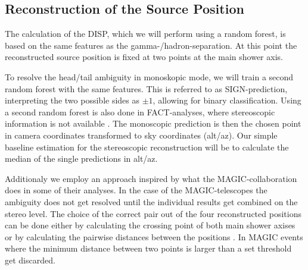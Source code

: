 

\subsection{Reconstruction of the Source Position}
\label{sec:source_position}


The calculation of the DISP, which we will perform using a random forest,
is based on the same features as the gamma-/hadron-separation.
At this point the reconstructed source position
is fixed at two points at the main shower axis.

To resolve the head/tail ambiguity in monoskopic mode,
we will train a second random forest with the same features.
This is referred to as SIGN-prediction, interpreting the two possible sides
as $\pm1$, allowing for binary classification.
Using a second random forest is also done in FACT-analyses,
where stereoscopic information is not available \cite{fact_sign_performance}.
The monoscopic prediction is then the chosen point in camera coordinates transformed
to sky coordinates (alt/az).
Our simple baseline estimation for the stereoscopic reconstruction will be to
calculate the median of the single predictions in alt/az.

Additionaly we employ an approach inspired by 
what the MAGIC-collaboration does in some of their analyses.
In the case of the MAGIC-telescopes the ambiguity does not
get resolved until the individual results get combined
on the stereo level. The choice of the correct
pair out of the four reconstructed positions can be done either
by calculating the crossing point of both main shower axises
or by calculating the pairwise distances between the positions \cite{ALEKSIC201676}.
In MAGIC events where the minimum distance between two points is larger than a set threshold
get discarded.

